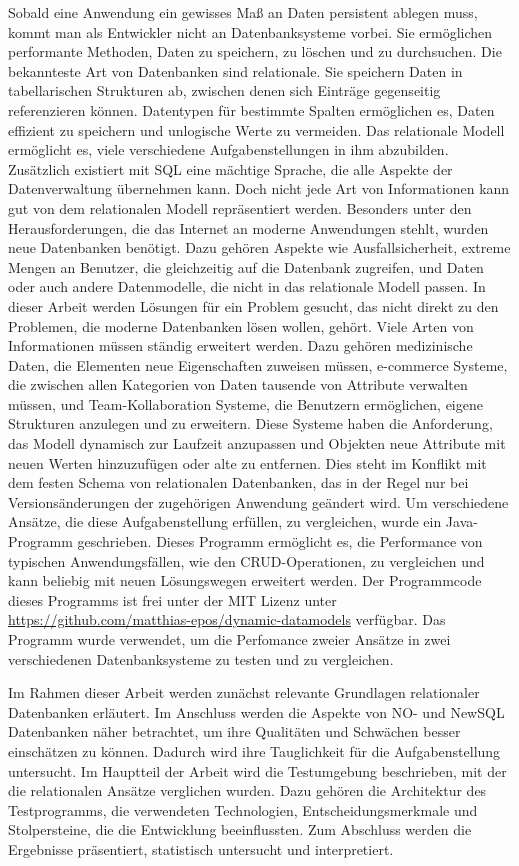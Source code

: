 Sobald eine Anwendung ein gewisses Maß an Daten persistent ablegen muss, kommt man als Entwickler nicht an Datenbanksysteme vorbei. Sie ermöglichen performante Methoden, Daten zu speichern, zu löschen und zu durchsuchen. Die bekannteste Art von Datenbanken sind relationale. Sie speichern Daten in tabellarischen Strukturen ab, zwischen denen sich Einträge gegenseitig referenzieren können. Datentypen für bestimmte Spalten ermöglichen es, Daten effizient zu speichern und unlogische Werte zu vermeiden. Das relationale Modell ermöglicht es, viele verschiedene Aufgabenstellungen in ihm abzubilden. Zusätzlich existiert mit SQL eine mächtige Sprache, die alle Aspekte der Datenverwaltung übernehmen kann. Doch nicht jede Art von Informationen kann gut von dem relationalen Modell repräsentiert werden. Besonders unter den Herausforderungen, die das Internet an moderne Anwendungen stehlt, wurden neue Datenbanken benötigt. Dazu gehören Aspekte wie Ausfallsicherheit, extreme Mengen an Benutzer, die gleichzeitig auf die Datenbank zugreifen, und Daten oder auch andere Datenmodelle, die nicht in das relationale Modell passen. In dieser Arbeit werden Lösungen für ein Problem gesucht, das nicht direkt zu den Problemen, die moderne Datenbanken lösen wollen, gehört. Viele Arten von Informationen müssen ständig erweitert werden. Dazu gehören medizinische Daten, die Elementen neue Eigenschaften zuweisen müssen, e-commerce Systeme, die zwischen allen Kategorien von Daten tausende von Attribute verwalten müssen, und Team-Kollaboration Systeme, die Benutzern ermöglichen, eigene Strukturen anzulegen und zu erweitern. Diese Systeme haben die Anforderung, das Modell dynamisch zur Laufzeit anzupassen und Objekten neue Attribute mit neuen Werten hinzuzufügen oder alte zu entfernen. Dies steht im Konflikt mit dem festen Schema von relationalen Datenbanken, das in der Regel nur bei Versionsänderungen der zugehörigen Anwendung geändert wird. Um verschiedene Ansätze, die diese Aufgabenstellung erfüllen, zu vergleichen, wurde ein Java-Programm geschrieben. Dieses Programm ermöglicht es, die Performance von typischen Anwendungsfällen, wie den CRUD-Operationen, zu vergleichen und kann beliebig mit neuen Lösungswegen erweitert werden. Der Programmcode dieses Programms ist frei unter der MIT Lizenz unter \url{https://github.com/matthias-epos/dynamic-datamodels} verfügbar. Das Programm wurde verwendet, um die Perfomance zweier Ansätze in zwei verschiedenen Datenbanksysteme zu testen und zu vergleichen.

Im Rahmen dieser Arbeit werden zunächst relevante Grundlagen relationaler Datenbanken erläutert. Im Anschluss werden die Aspekte von NO- und NewSQL Datenbanken näher betrachtet, um ihre Qualitäten und Schwächen besser einschätzen zu können. Dadurch wird ihre Tauglichkeit für die Aufgabenstellung untersucht. Im Hauptteil der Arbeit wird die Testumgebung beschrieben, mit der die relationalen Ansätze verglichen wurden. Dazu gehören die Architektur des Testprogramms, die verwendeten Technologien, Entscheidungsmerkmale und Stolpersteine, die die Entwicklung beeinflussten. Zum Abschluss werden die Ergebnisse präsentiert, statistisch untersucht und interpretiert.